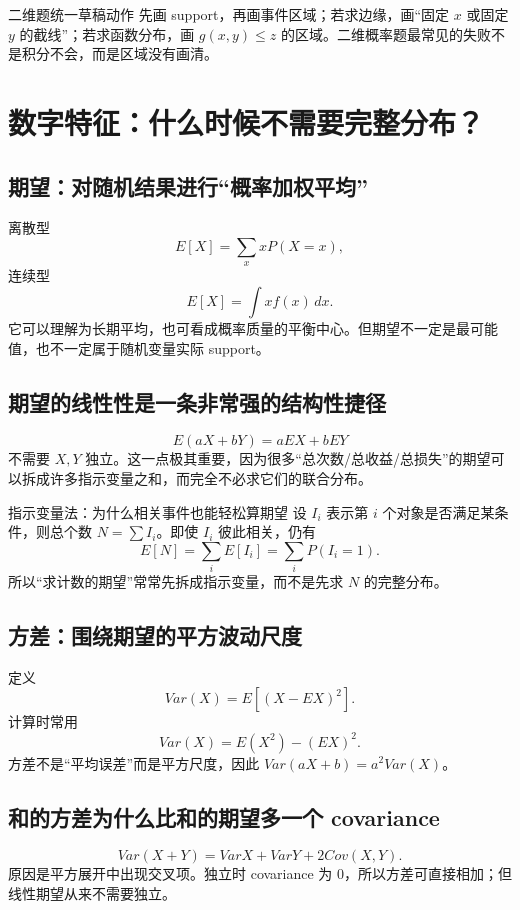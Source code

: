 \documentclass[11pt,a4paper,openany]{ctexbook}
\begin{document}
\begin{methodbox}{二维题统一草稿动作}
先画 support，再画事件区域；若求边缘，画“固定 $x$ 或固定 $y$ 的截线”；若求函数分布，画 $g(x,y)\le z$ 的区域。二维概率题最常见的失败不是积分不会，而是区域没有画清。
\end{methodbox}

\chapter{数字特征：什么时候不需要完整分布？}

\section{期望：对随机结果进行“概率加权平均”}
离散型
\[
E[X]=\sum_xxP(X=x),
\]
连续型
\[
E[X]=\int xf(x)\,dx.
\]
它可以理解为长期平均，也可看成概率质量的平衡中心。但期望不一定是最可能值，也不一定属于随机变量实际 support。

\section{期望的线性性是一条非常强的结构性捷径}
\[
E(aX+bY)=aEX+bEY
\]
不需要 $X,Y$ 独立。这一点极其重要，因为很多“总次数/总收益/总损失”的期望可以拆成许多指示变量之和，而完全不必求它们的联合分布。

\begin{examplebox}{指示变量法：为什么相关事件也能轻松算期望}
设 $I_i$ 表示第 $i$ 个对象是否满足某条件，则总个数 $N=\sum I_i$。即使 $I_i$ 彼此相关，仍有
\[
E[N]=\sum_iE[I_i]=\sum_iP(I_i=1).
\]
所以“求计数的期望”常常先拆成指示变量，而不是先求 $N$ 的完整分布。
\end{examplebox}

\section{方差：围绕期望的平方波动尺度}
定义
\[
Var(X)=E[(X-EX)^2].
\]
计算时常用
\[
Var(X)=E(X^2)-(EX)^2.
\]
方差不是“平均误差”而是平方尺度，因此 $Var(aX+b)=a^2Var(X)$。

\section{和的方差为什么比和的期望多一个 covariance}
\[
Var(X+Y)=VarX+VarY+2Cov(X,Y).
\]
原因是平方展开中出现交叉项。独立时 covariance 为 0，所以方差可直接相加；但线性期望从来不需要独立。
\end{document}
